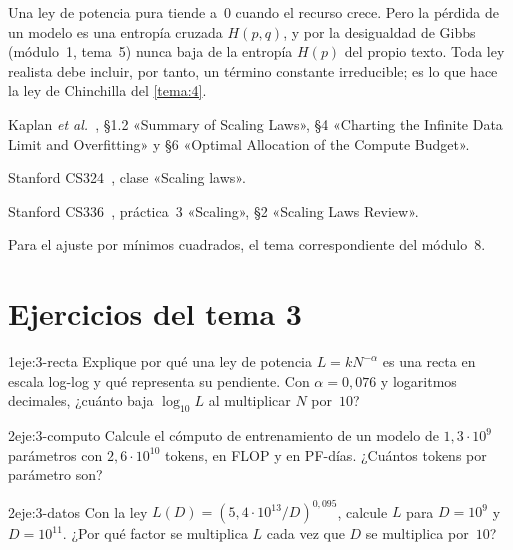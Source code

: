 \begin{observacion}
Una ley de potencia pura tiende a~$0$ cuando el recurso crece. Pero la pérdida de un modelo es una entropía cruzada $H(p,q)$, y por la desigualdad de Gibbs (módulo~1, tema~5) nunca baja de la entropía $H(p)$ del propio texto. Toda ley realista debe incluir, por tanto, un término constante irreducible; es lo que hace la ley de Chinchilla del \cref{tema:4}.
\end{observacion}

\begin{lecturas}
\item Kaplan \emph{et al.}~\cite{kaplan}, §1.2 «Summary of Scaling Laws», §4 «Charting the Infinite Data Limit and Overfitting» y §6 «Optimal Allocation of the Compute Budget».
\item Stanford CS324~\cite{cs324}, clase «Scaling laws».
\item Stanford CS336~\cite{cs336a3}, práctica~3 «Scaling», §2 «Scaling Laws Review».
\item Para el ajuste por mínimos cuadrados, el tema correspondiente del módulo~8.
\end{lecturas}

\section*{Ejercicios del tema 3}

\begin{ejercicio}{1}{eje:3-recta}
Explique por qué una ley de potencia $L=kN^{-\alpha}$ es una recta en escala log-log y qué representa su pendiente. Con $\alpha=0{,}076$ y logaritmos decimales, ¿cuánto baja $\log_{10}L$ al multiplicar $N$ por~$10$?
\end{ejercicio}

\begin{ejercicio}{2}{eje:3-computo}
Calcule el cómputo de entrenamiento de un modelo de $1{,}3\cdot 10^{9}$ parámetros con $2{,}6\cdot 10^{10}$ tokens, en FLOP y en PF-días. ¿Cuántos tokens por parámetro son?
\end{ejercicio}

\begin{ejercicio}{2}{eje:3-datos}
Con la ley $L(D)=(5{,}4\cdot 10^{13}/D)^{0{,}095}$, calcule $L$ para $D=10^{9}$ y $D=10^{11}$. ¿Por qué factor se multiplica $L$ cada vez que $D$ se multiplica por~$10$?
\end{ejercicio}


